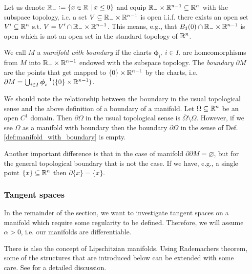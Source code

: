 \documentclass[../master_thesis.tex]{subfiles}
\begin{document}
Let us denote $\mathbb{R}_- \vcentcolon= \{ x \in \mathbb{R} \mid x \leq 0 \}$ 
and equip $\mathbb{R}_- \times \mathbb{R}^{n-1} \subseteq \mathbb{R}^n$ with the 
subspace topology, i.e. a set $V \subseteq \mathbb{R}_- \times \mathbb{R}^{n-1}$ is
open i.i.f. there exists an open set $V' \subseteq \mathbb{R}^n$ s.t. 
$V = V' \cap \mathbb{R}_- \times \mathbb{R}^{n-1}$. This means, e.g., that 
$B_1(0) \cap \mathbb{R}_- \times \mathbb{R}^{n-1}$ is open which is not an open set 
in the standard topology of $\mathbb{R}^n$.
\begin{definition}\label{def:manifold_with_boundary}
    We call $M$ a \textit{manifold with boundary} if the charts $\boldsymbol{\phi}_i$, 
    $i\in I$, are homeomorphisms from $M$ into $\mathbb{R}_- \times \mathbb{R}^{n-1}$ 
    endowed with the subspace topology. The \textit{boundary} 
    $\partial M$ are the points that get mapped to $\{0\} \times \mathbb{R}^{n-1}$ 
    by the charts, i.e. $\partial M = \bigcup_{i\in I} \boldsymbol{\phi}_i^{-1}(\{0\} \times \mathbb{R}^{n-1})$.
\end{definition}

\begin{remark}
    We should note the relationship between the boundary in the usual topological sense 
    and the above definition of a boundary of a manifold. Let $\Omega \subseteq \mathbb{R}^n$ be 
    an open $C^1$ domain. Then $\partial \Omega$ in the usual topological sense 
    is $\overline{\Omega} \setminus \Omega$. However, if we see $\Omega$ 
    as a manifold with boundary then the boundary $\partial \Omega$ in the sense of 
    Def. \ref{def:manifold_with_boundary} is empty. 

    Another important difference is that in the case of manifold $\partial \partial M = \varnothing$,
    but for the general topological boundary that is not the case. If we have, e.g., a single 
    point $\{ x \} \subseteq \mathbb{R}^n$ then $\partial \{x \} = \{ x \}$.   
\end{remark}

\subsubsection{Tangent spaces}\label{sec:tangent_spaces}

In the remainder of the section, we want to investigate tangent spaces on a manifold 
which require some regularity to be defined. Therefore, 
we will assume $\alpha > 0$, i.e. our manifolds are 
differentiable.

\begin{remark}
    There is also the concept of Lipschitzian manifolds. Using Rademachers 
    theorem, some of the structures that are introduced below can be extended 
    with some care. See \cite{lipschitz_manifolds} for a detailed discussion.
\end{remark}
\end{document}
